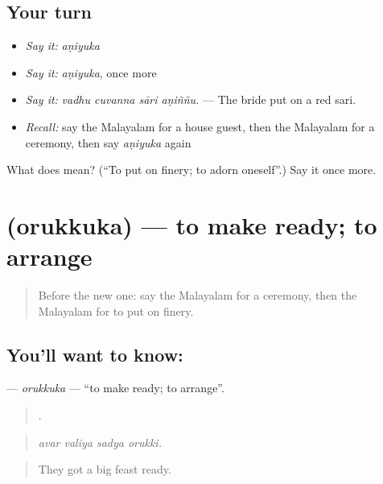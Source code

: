 \subsection*{Your turn}
\begin{itemize}
\raggedright
  \item \emph{Say it:} \emph{aṇiyuka}
  \item \emph{Say it:} \emph{aṇiyuka}, once more
  \item \emph{Say it:} \emph{vadhu cuvanna sāri aṇiññu.} — The bride put on a red sari.
  \item \emph{Recall:} say the Malayalam for a house guest, then the Malayalam for a ceremony, then say \emph{aṇiyuka} again
\end{itemize}

\begin{tcolorbox}[breakable,colback=teal!4,colframe=teal!35!black,title={Before you move on}]
What does  mean? (\textquotedblleft{}To put on finery; to adorn oneself\textquotedblright{}.) Say it once more.
\end{tcolorbox}
\section[\texorpdfstring{\ml{ഒരുക്കുക} (orukkuka)}{ഒരുക്കുക (orukkuka)}]{ (orukkuka) — to make ready; to arrange}

\label{lesson:ML-C387-orukkuka}



\begin{quote}
Before the new one: say the Malayalam for a ceremony, then the Malayalam for to put on finery.
\end{quote}

\subsection*{You'll want to know: }
\textbf{} — \emph{orukkuka} — \textquotedblleft{}to make ready; to arrange\textquotedblright{}.

\begin{quote}
   .
\end{quote}

\begin{quote}
\emph{avar valiya sadya orukki.}
\end{quote}

\begin{quote}
They got a big feast ready.
\end{quote}

